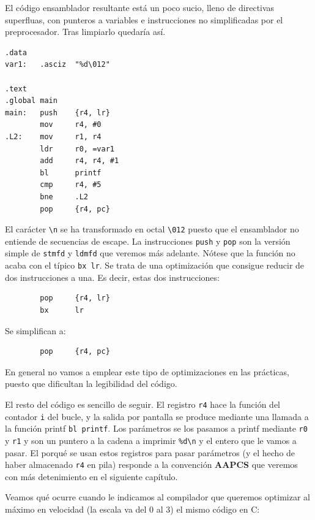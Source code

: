 El código ensamblador resultante está un poco sucio, lleno de directivas superfluas,
con punteros a variables e instrucciones no simplificadas por el preprocesador. Tras
limpiarlo quedaría así.

\begin{lstlisting}[caption={Código del programa tipos3a.s},label={lst:codigoPract2_6}]
.data
var1:   .asciz  "%d\012"

.text
.global main
main:   push    {r4, lr}
        mov     r4, #0
.L2:    mov     r1, r4
        ldr     r0, =var1
        add     r4, r4, #1
        bl      printf
        cmp     r4, #5
        bne     .L2
        pop     {r4, pc}
\end{lstlisting}

El carácter {\tt \textbackslash n} se ha transformado en octal {\tt \textbackslash 012} puesto que el ensamblador
no entiende de secuencias de escape. La instrucciones {\tt push} y {\tt pop} son la versión
simple de {\tt stmfd} y {\tt ldmfd} que veremos más adelante. Nótese que la función no acaba
con el típico {\tt bx lr}. Se trata de una optimización que consigue reducir de dos
instrucciones a una. Es decir, estas dos instrucciones:

\begin{lstlisting}
        pop     {r4, lr}
        bx      lr
\end{lstlisting}

\newpage
Se simplifican a:

\begin{lstlisting}
        pop     {r4, pc}
\end{lstlisting}

En general no vamos a emplear este tipo de optimizaciones en las prácticas, puesto que
dificultan la legibilidad del código.

El resto del código es sencillo de seguir. El registro {\tt r4} hace la función del
contador {\tt i} del bucle, y la salida por pantalla se produce mediante una llamada
a la función printf {\tt bl printf}. Los parámetros se los pasamos a printf mediante
{\tt r0} y {\tt r1} y son un puntero a la cadena a imprimir {\tt \%d\textbackslash n}
y el entero que le vamos a pasar. El porqué se usan estos registros para pasar
parámetros (y el hecho de
haber almacenado {\tt r4} en pila) responde a la convención {\bf AAPCS} que
veremos con más detenimiento en el siguiente capítulo.

Veamos qué ocurre cuando le indicamos al compilador que queremos optimizar al
máximo en velocidad (la escala va del 0 al 3) el mismo código en C:

